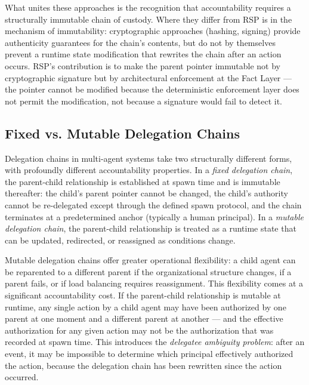 What unites these approaches is the recognition that accountability requires a structurally immutable chain of custody. Where they differ from RSP is in the mechanism of immutability: cryptographic approaches (hashing, signing) provide authenticity guarantees for the chain's contents, but do not by themselves prevent a runtime state modification that rewrites the chain after an action occurs. RSP's contribution is to make the parent pointer immutable not by cryptographic signature but by architectural enforcement at the Fact Layer — the pointer cannot be modified because the deterministic enforcement layer does not permit the modification, not because a signature would fail to detect it.

\subsection{Fixed vs. Mutable Delegation Chains}

Delegation chains in multi-agent systems take two structurally different forms, with profoundly different accountability properties. In a \emph{fixed delegation chain}, the parent-child relationship is established at spawn time and is immutable thereafter: the child's parent pointer cannot be changed, the child's authority cannot be re-delegated except through the defined spawn protocol, and the chain terminates at a predetermined anchor (typically a human principal). In a \emph{mutable delegation chain}, the parent-child relationship is treated as a runtime state that can be updated, redirected, or reassigned as conditions change.

Mutable delegation chains offer greater operational flexibility: a child agent can be reparented to a different parent if the organizational structure changes, if a parent fails, or if load balancing requires reassignment. This flexibility comes at a significant accountability cost. If the parent-child relationship is mutable at runtime, any single action by a child agent may have been authorized by one parent at one moment and a different parent at another — and the effective authorization for any given action may not be the authorization that was recorded at spawn time. This introduces the \emph{delegatee ambiguity problem}: after an event, it may be impossible to determine which principal effectively authorized the action, because the delegation chain has been rewritten since the action occurred.

